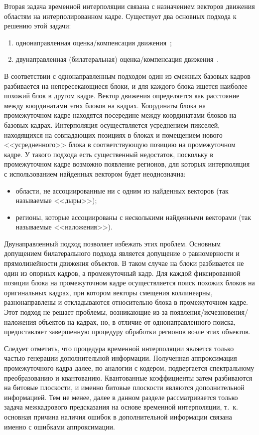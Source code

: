 Вторая задача временной интерполяции связана с назначением векторов движения областям на интерполированном кадре. Существует два основных подхода к решению этой задачи:
\begin{enumerate}
\item однонаправленная оценка/компенсация движения~\cite{Haan1993};
\item двунаправленная (билатеральная) оценка/компенсация движения~\cite{Choi2000}.
\end{enumerate}
В соответствии с однонаправленным подходом один из смежных базовых кадров разбивается на непересекающиеся блоки, и для каждого блока ищется наиболее похожий блок в другом кадре. Вектор движения определяется как расстояние между координатами этих блоков на кадрах. Координаты блока на промежуточном кадре находятся посередине между координатами блоков на базовых кадрах. Интерполяция осуществляется усреднением пикселей, находящихся на совпадающих позициях в блоках и помещением нового <<усредненного>> блока в соответствующую позицию на промежуточном кадре. У такого подхода есть существенный недостаток, поскольку в промежуточном кадре возможно появление регионов, для которых интерполяция с использованием найденных вектором будет неоднозначна:
\begin{itemize}
\item области, не ассоциированные ни с одним из найденных векторов (так называемые <<дыры>>);
\item регионы, которые ассоциированы с несколькими найденными векторами (так называемые <<наложения>>).
\end{itemize}
Двунаправленный подход позволяет избежать этих проблем. Основным допущением билатерального подхода является допущение о равномерности и прямолинейности движения объектов. В таком случае на блоки разбивается не один из опорных кадров, а промежуточный кадр. Для каждой фиксированной позиции блока на промежуточном кадре осуществляется поиск похожих блоков на оригинальных кадрах, при котором векторы смещения коллинеарны, разнонаправлены и откладываются относительно блока в промежуточном кадре. Этот подход не решает проблемы, возникающие из-за появления/исчезновения/наложения объектов на кадрах, но, в отличие от однонаправленного поиска, предоставляет завершенную процедуру обработки регионов возле этих объектов.

Следует отметить, что процедура временной интерполяции является только частью генерации дополнительной информации. Полученная аппроксимация промежуточного кадра далее, по аналогии с кодером, подвергается спектральному преобразованию и квантованию. Квантованные коэффициенты затем разбиваются на битовые плоскости, и именно битовые плоскости являются дополнительной информацией. Тем не менее, далее в данном разделе рассматривается только задача межкадрового предсказания на основе временной интерполяции, т.~к. основная причина наличия ошибок в дополнительной информации связана именно с ошибками аппроксимации.

